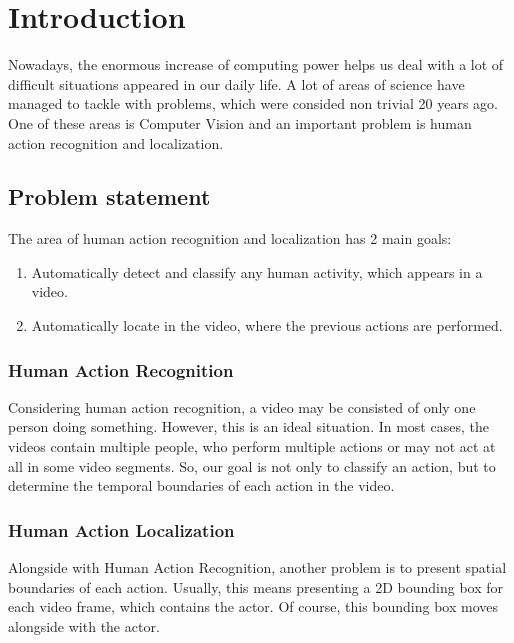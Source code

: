 



% 
\en
\chapter{Introduction}
Nowadays, the enormous increase of computing power helps us deal with a lot of difficult situations appeared in our daily life.
A lot of areas of science have managed to tackle with problems, which were consided non trivial 20 years ago. One of
these areas is Computer Vision and an important problem is human action recognition and localization.
\section{Problem statement}
The area of human action recognition and localization has 2 main goals:
\begin{enumerate}
\item Automatically detect and classify any human activity, which appears in a video.
\item Automatically locate in the video, where the previous actions are performed.
\end{enumerate}

\subsection{Human Action Recognition}
Considering human action recognition, a video may be consisted of  only one person doing something. However, this is an ideal
situation. In most cases, the videos contain multiple people, who perform multiple actions or may not act at all in some video segments.
So, our goal is not only to classify an action, but to determine the temporal boundaries of each action in the video.
\subsection{Human Action Localization}
Alongside with Human Action Recognition, another problem is to present spatial boundaries of each action. Usually, this means
presenting a 2D bounding box for each video frame, which contains the actor. Of course, this bounding box moves alongside with
the actor.


